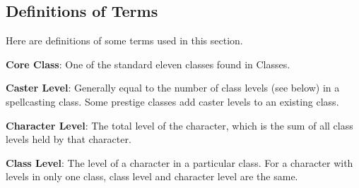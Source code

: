 \subsection{Definitions of Terms}

				
Here are definitions of some terms used in this section.
				
\textbf{Core Class}: One of the standard eleven classes found in Classes.
				
\textbf{Caster Level}: Generally equal to the number of class levels (see below) in a spellcasting class. Some prestige classes add caster levels to an existing class.
				
\textbf{Character Level}: The total level of the character, which is the sum of all class levels held by that character.
				
\textbf{Class Level}: The level of a character in a particular class. For a character with levels in only one class, class level and character level are the same.
	        	










